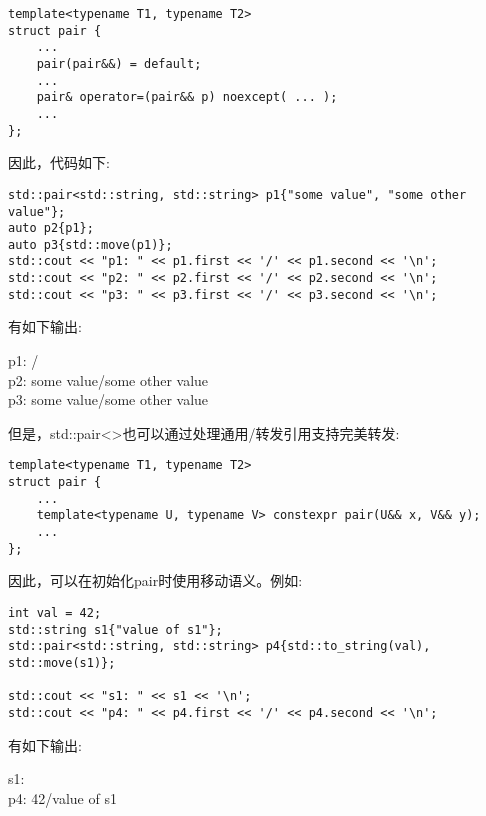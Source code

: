 \begin{lstlisting}[caption={}]
template<typename T1, typename T2>
struct pair {
	...
	pair(pair&&) = default;
	...
	pair& operator=(pair&& p) noexcept( ... );
	...
};
\end{lstlisting}

因此，代码如下:\par

\begin{lstlisting}[caption={}]
std::pair<std::string, std::string> p1{"some value", "some other value"};
auto p2{p1};
auto p3{std::move(p1)};
std::cout << "p1: " << p1.first << '/' << p1.second << '\n';
std::cout << "p2: " << p2.first << '/' << p2.second << '\n';
std::cout << "p3: " << p3.first << '/' << p3.second << '\n';
\end{lstlisting}

有如下输出:\par

\begin{tcolorbox}[colback=white,colframe=black]
p1: / \\
p2: some value/some other value \\
p3: some value/some other value
\end{tcolorbox}

但是，std::pair<>也可以通过处理通用/转发引用支持完美转发:\par

\begin{lstlisting}[caption={}]
template<typename T1, typename T2>
struct pair {
	...
	template<typename U, typename V> constexpr pair(U&& x, V&& y);
	...
};
\end{lstlisting}

因此，可以在初始化pair时使用移动语义。例如:\par

\begin{lstlisting}[caption={}]
int val = 42;
std::string s1{"value of s1"};
std::pair<std::string, std::string> p4{std::to_string(val), std::move(s1)};

std::cout << "s1: " << s1 << '\n';
std::cout << "p4: " << p4.first << '/' << p4.second << '\n';
\end{lstlisting}

有如下输出:\par

\begin{tcolorbox}[colback=white,colframe=black]
s1: \\
p4: 42/value of s1
\end{tcolorbox}

